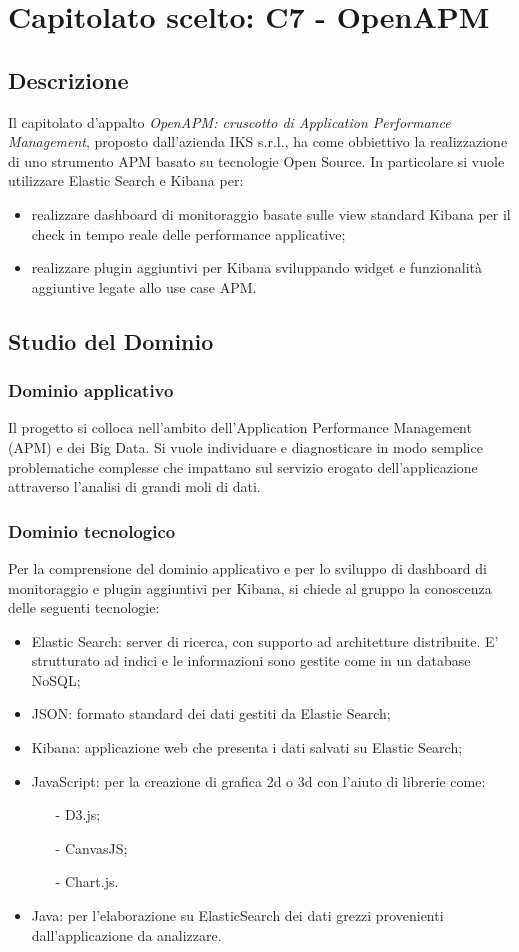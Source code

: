 \newpage
\section{Capitolato scelto: C7 - OpenAPM}
	\subsection{Descrizione}
	Il capitolato d'appalto \emph{OpenAPM: cruscotto di Application Performance Management},  proposto dall'azienda IKS s.r.l., ha come obbiettivo la realizzazione di uno strumento APM basato su tecnologie Open Source. In particolare si vuole utilizzare Elastic Search e Kibana per:
	\begin{itemize}
		\item realizzare dashboard di monitoraggio  basate sulle view standard Kibana per il check in tempo reale delle performance applicative;
		\item realizzare plugin aggiuntivi per Kibana sviluppando widget e funzionalità aggiuntive legate allo use case APM. 
	\end{itemize}
	
	\subsection{Studio del Dominio}
		\subsubsection{Dominio applicativo}
		Il progetto si colloca nell'ambito dell'Application Performance Management (APM) e dei Big Data. Si vuole individuare e diagnosticare in modo semplice problematiche complesse che impattano sul servizio erogato dell'applicazione attraverso l'analisi di grandi moli di dati.
		\subsubsection{Dominio tecnologico}
		Per la comprensione del dominio applicativo e per lo sviluppo di dashboard di monitoraggio e plugin aggiuntivi per Kibana, si chiede al gruppo la conoscenza delle seguenti tecnologie:
		\begin{itemize}
			\item Elastic Search: server di ricerca, con supporto ad architetture distribuite. E' strutturato ad indici e le informazioni sono gestite come in un database NoSQL;
			\item JSON: formato standard dei dati gestiti da Elastic Search;
			\item Kibana: applicazione web che presenta i dati salvati su Elastic Search;
			\item JavaScript: per la creazione di grafica 2d o 3d con l'aiuto di librerie come:
			\begin{itemize}
				\item[-] D3.js;
				\item[-] CanvasJS;
				\item[-] Chart.js.
			\end{itemize}
			\item Java: per l'elaborazione su ElasticSearch dei dati grezzi provenienti dall'applicazione da analizzare.
		\end{itemize}
